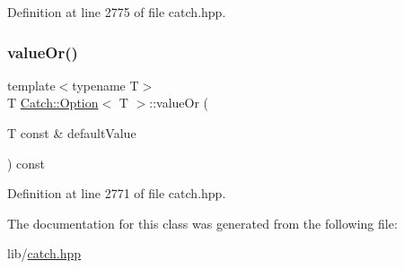 Definition at line 2775 of file catch.\+hpp.

\hypertarget{class_catch_1_1_option_a8d9ae2e30b0eb76fe134a6fbc8423124}{}\label{class_catch_1_1_option_a8d9ae2e30b0eb76fe134a6fbc8423124} 
\subsubsection{\texorpdfstring{value\+Or()}{valueOr()}}
{\footnotesize\ttfamily template$<$typename T$>$ \\
T \hyperlink{class_catch_1_1_option}{Catch\+::\+Option}$<$ T $>$\+::value\+Or (\begin{DoxyParamCaption}\item[{T const \&}]{default\+Value }\end{DoxyParamCaption}) const\hspace{0.3cm}{\ttfamily [inline]}}



Definition at line 2771 of file catch.\+hpp.



The documentation for this class was generated from the following file\+:\begin{DoxyCompactItemize}
\item 
lib/\hyperlink{catch_8hpp}{catch.\+hpp}\end{DoxyCompactItemize}
